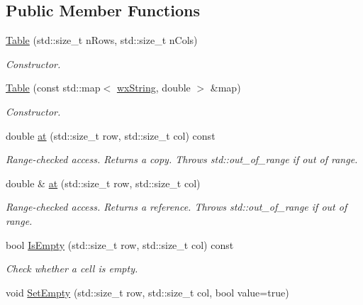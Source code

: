 \subsection*{Public Member Functions}
\begin{DoxyCompactItemize}
\item 
\hyperlink{classstf_1_1Table_a1f1d6afbd987fe37bd82b1a48b81376c}{Table} (std::size\_\-t nRows, std::size\_\-t nCols)
\begin{DoxyCompactList}\small\item\em Constructor. \item\end{DoxyCompactList}\item 
\hyperlink{classstf_1_1Table_a305aa883ca1e57d53c4549e41ca0359c}{Table} (const std::map$<$ \hyperlink{classwxString}{wxString}, double $>$ \&map)
\begin{DoxyCompactList}\small\item\em Constructor. \item\end{DoxyCompactList}\item 
double \hyperlink{classstf_1_1Table_a04cc74be93cc5500bff4e3a14b64e138}{at} (std::size\_\-t row, std::size\_\-t col) const 
\begin{DoxyCompactList}\small\item\em Range-\/checked access. Returns a copy. Throws std::out\_\-of\_\-range if out of range. \item\end{DoxyCompactList}\item 
double \& \hyperlink{classstf_1_1Table_a1c2afdf17375d9597b48c7e6746ccf9f}{at} (std::size\_\-t row, std::size\_\-t col)
\begin{DoxyCompactList}\small\item\em Range-\/checked access. Returns a reference. Throws std::out\_\-of\_\-range if out of range. \item\end{DoxyCompactList}\item 
bool \hyperlink{classstf_1_1Table_a861ed4ad0902030911f7d397d9364e33}{IsEmpty} (std::size\_\-t row, std::size\_\-t col) const 
\begin{DoxyCompactList}\small\item\em Check whether a cell is empty. \item\end{DoxyCompactList}\item 
void \hyperlink{classstf_1_1Table_aafe151071912c07baee9ff503f914ae0}{SetEmpty} (std::size\_\-t row, std::size\_\-t col, bool value=true)

\end{DoxyCompactItemize}
